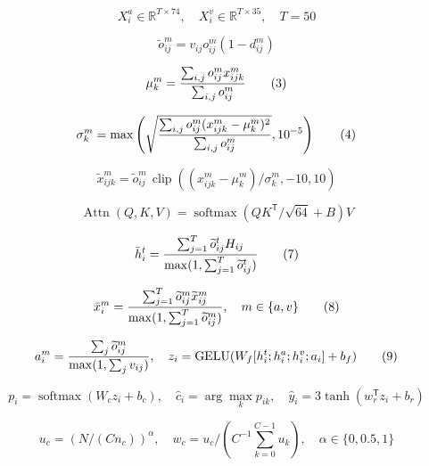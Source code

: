 \begin{equation}
X_i^a\in\mathbb{R}^{T\times74},\quad X_i^v\in\mathbb{R}^{T\times35},\quad T=50\tag{1}
\end{equation}

\begin{equation}
\widetilde{o}_{ij}^{m}=v_{ij}o_{ij}^{m}(1-d_{ij}^{m})\tag{2}
\end{equation}

\begin{equation}
\mu_k^m={\sum_{i,j}o_{ij}^m x_{ijk}^m\over\sum_{i,j}o_{ij}^m}\tag{3}
\end{equation}

\begin{equation}
\sigma_k^m=\max\left(\sqrt{{\sum_{i,j}o_{ij}^m(x_{ijk}^m-\mu_k^m)^2\over\sum_{i,j}o_{ij}^m}},10^{-5}\right)\tag{4}
\end{equation}

\begin{equation}
\widetilde{x}_{ijk}^{m}=\widetilde{o}_{ij}^{m}\,\operatorname{clip}((x_{ijk}^{m}-\mu_k^m)/\sigma_k^m,-10,10)\tag{5}
\end{equation}

\begin{equation}
\operatorname{Attn}(Q,K,V)=\operatorname{softmax}(QK^{\mathsf T}/\sqrt{64}+B)V\tag{6}
\end{equation}

\begin{equation}
\bar h_i^t={\sum_{j=1}^T\widetilde{o}_{ij}^t H_{ij}\over\max(1,\sum_{j=1}^T\widetilde{o}_{ij}^t)}\tag{7}
\end{equation}

\begin{equation}
\bar x_i^m={\sum_{j=1}^T\widetilde{o}_{ij}^m\widetilde{x}_{ij}^m\over\max(1,\sum_{j=1}^T\widetilde{o}_{ij}^m)},\quad m\in\{a,v\}\tag{8}
\end{equation}

\begin{equation}
a_i^m={\sum_j\widetilde{o}_{ij}^m\over\max(1,\sum_jv_{ij})},\quad z_i=\operatorname{GELU}(W_f[h_i^t;h_i^a;h_i^v;a_i]+b_f)\tag{9}
\end{equation}

\begin{equation}
p_i=\operatorname{softmax}(W_cz_i+b_c),\quad\hat c_i=\arg\max_kp_{ik},\quad\hat y_i=3\tanh(w_r^{\mathsf T}z_i+b_r)\tag{10}
\end{equation}

\begin{equation}
u_c=(N/(C n_c))^\alpha,\quad w_c=u_c/(C^{-1}\sum_{k=0}^{C-1}u_k),\quad\alpha\in\{0,0.5,1\}\tag{11}
\end{equation}

